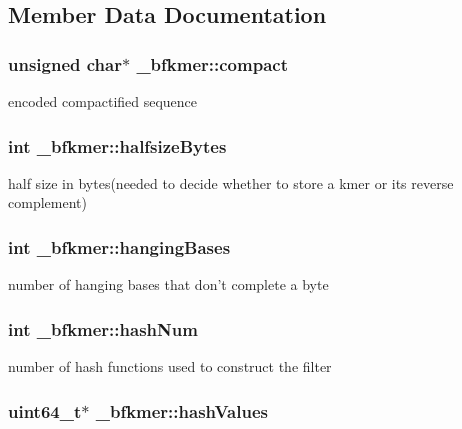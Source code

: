 \subsection{Member Data Documentation}
\hypertarget{struct__bfkmer_a42dcd2ff2a59169fb66f89fd0aa892a9}{
\subsubsection[{compact}]{\setlength{\rightskip}{0pt plus 5cm}unsigned char$\ast$ \+\_\+bfkmer\+::compact}}\label{struct__bfkmer_a42dcd2ff2a59169fb66f89fd0aa892a9}
encoded compactified sequence \hypertarget{struct__bfkmer_a8bb57e85f90ed06b9de391be9eeba3e8}{
\subsubsection[{halfsize\+Bytes}]{\setlength{\rightskip}{0pt plus 5cm}int \+\_\+bfkmer\+::halfsize\+Bytes}}\label{struct__bfkmer_a8bb57e85f90ed06b9de391be9eeba3e8}
half size in bytes(needed to decide whether to store a kmer or its reverse complement) \hypertarget{struct__bfkmer_a151a92f8ca72f2d778f9ad26e96b35ae}{
\subsubsection[{hanging\+Bases}]{\setlength{\rightskip}{0pt plus 5cm}int \+\_\+bfkmer\+::hanging\+Bases}}\label{struct__bfkmer_a151a92f8ca72f2d778f9ad26e96b35ae}
number of hanging bases that don't complete a byte \hypertarget{struct__bfkmer_a5694e46bd18449baa91d25178d1634bf}{
\subsubsection[{hash\+Num}]{\setlength{\rightskip}{0pt plus 5cm}int \+\_\+bfkmer\+::hash\+Num}}\label{struct__bfkmer_a5694e46bd18449baa91d25178d1634bf}
number of hash functions used to construct the filter \hypertarget{struct__bfkmer_afa4bc228a6d89c923dbda0357071187a}{
\subsubsection[{hash\+Values}]{\setlength{\rightskip}{0pt plus 5cm}uint64\+\_\+t$\ast$ \+\_\+bfkmer\+::hash\+Values}}\label{struct__bfkmer_afa4bc228a6d89c923dbda0357071187a}
